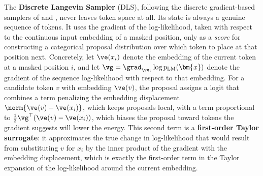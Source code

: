 The \textbf{Discrete Langevin Sampler} (DLS), following the discrete gradient-based samplers of \citet{grathwohl2021oops} and \citet{zhang2022langevin}, never leaves token space at all. Its state is always a genuine sequence of tokens. It uses the gradient of the log-likelihood, taken with respect to the continuous input embedding of a masked position, only as a \emph{score} for constructing a categorical proposal distribution over which token to place at that position next. Concretely, let $\ve(x_i)$ denote the embedding of the current token at a masked position $i$, and let $\vg = \grad_{\ve_i}\log p_{\text{LM}}(\bm{x})$ denote the gradient of the sequence log-likelihood with respect to that embedding. For a candidate token $v$ with embedding $\ve(v)$, the proposal assigns a logit that combines a term penalizing the embedding displacement $\norm{\ve(v) - \ve(x_i)}$, which keeps proposals local, with a term proportional to $\tfrac{1}{2}\vg^\top(\ve(v) - \ve(x_i))$, which biases the proposal toward tokens the gradient suggests will lower the energy. This second term is a \textbf{first-order Taylor surrogate}: it approximates the true change in log-likelihood that would result from substituting $v$ for $x_i$ by the inner product of the gradient with the embedding displacement, which is exactly the first-order term in the Taylor expansion of the log-likelihood around the current embedding.

